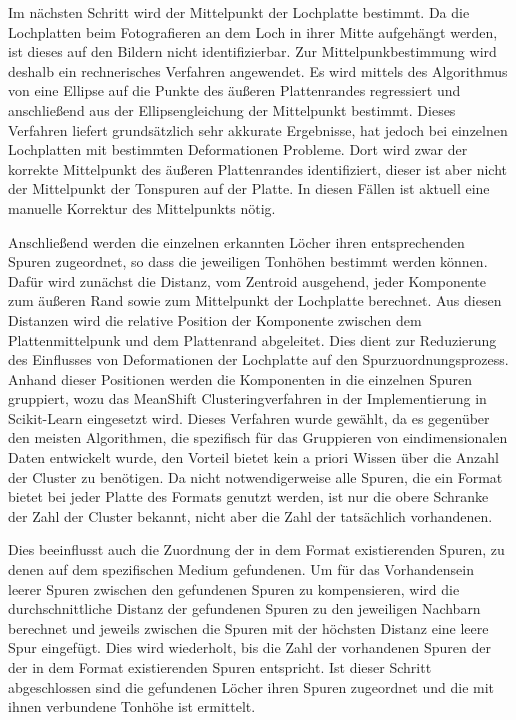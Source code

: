 Im nächsten Schritt wird der Mittelpunkt der Lochplatte bestimmt.
Da die Lochplatten beim Fotografieren an dem Loch in ihrer Mitte aufgehängt werden, ist dieses auf den Bildern nicht identifizierbar.
Zur Mittelpunkbestimmung wird deshalb ein rechnerisches Verfahren angewendet.
Es wird mittels des Algorithmus von \textcite[]{halir1998numerically} eine Ellipse auf die Punkte des äußeren Plattenrandes regressiert und anschließend aus der Ellipsengleichung der Mittelpunkt bestimmt.
Dieses Verfahren liefert grundsätzlich sehr akkurate Ergebnisse, hat jedoch bei einzelnen Lochplatten mit bestimmten Deformationen Probleme.
Dort wird zwar der korrekte Mittelpunkt des äußeren Plattenrandes identifiziert, dieser ist aber nicht der Mittelpunkt der Tonspuren auf der Platte.
In diesen Fällen ist aktuell eine manuelle Korrektur des Mittelpunkts nötig.

Anschließend werden die einzelnen erkannten Löcher ihren entsprechenden Spuren zugeordnet, so dass die jeweiligen Tonhöhen bestimmt werden können.
Dafür wird zunächst die Distanz, vom Zentroid ausgehend, jeder Komponente zum äußeren Rand sowie zum Mittelpunkt der Lochplatte berechnet.
Aus diesen Distanzen wird die relative Position der Komponente zwischen dem Plattenmittelpunk und dem Plattenrand abgeleitet.
Dies dient zur Reduzierung des Einflusses von Deformationen der Lochplatte auf den Spurzuordnungsprozess.
Anhand dieser Positionen werden die Komponenten in die einzelnen Spuren gruppiert, wozu das MeanShift Clusteringverfahren \parencite[]{meanshift} in der Implementierung in Scikit-Learn \parencite[]{scikit-learn} eingesetzt wird.
Dieses Verfahren wurde gewählt, da es gegenüber den meisten Algorithmen, die spezifisch für das Gruppieren von eindimensionalen Daten entwickelt wurde, den Vorteil bietet kein a priori Wissen über die Anzahl der Cluster zu benötigen.
Da nicht notwendigerweise alle Spuren, die ein Format bietet bei jeder Platte des Formats genutzt werden, ist nur die obere Schranke der Zahl der Cluster bekannt, nicht aber die Zahl der tatsächlich vorhandenen.

Dies beeinflusst auch die Zuordnung der in dem Format existierenden Spuren, zu denen auf dem spezifischen Medium gefundenen.
Um für das Vorhandensein leerer Spuren zwischen den gefundenen Spuren zu kompensieren, wird die durchschnittliche Distanz der gefundenen Spuren zu den jeweiligen Nachbarn berechnet und jeweils zwischen die Spuren mit der höchsten Distanz eine leere Spur eingefügt.
Dies wird wiederholt, bis die Zahl der vorhandenen Spuren der der in dem Format existierenden Spuren entspricht.
Ist dieser Schritt abgeschlossen sind die gefundenen Löcher ihren Spuren zugeordnet und die mit ihnen verbundene Tonhöhe ist ermittelt.

